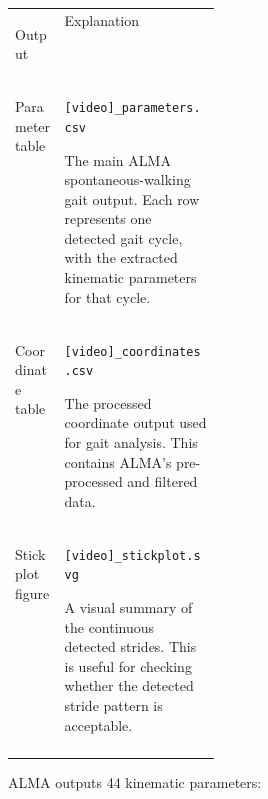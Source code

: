 \documentclass[11pt]{article}
\newif\ifalmaoutputtable
\newcommand{\boxedtoprule}{%
  \ifalmaoutputtable
    \arrayrulecolor{calloutOutputFrame}\hline\rowcolor{calloutOutputHeader}%
  \else
    \arrayrulecolor{almaBlue!62}\hline\rowcolor{almaSky!78}%
  \fi
}
\newcommand{\boxedmidrule}{%
  \ifalmaoutputtable
    \arrayrulecolor{calloutOutputFrame}\hline
  \else
    \arrayrulecolor{calloutDataFrame}\hline
  \fi
}
\newcommand{\boxedbottomrule}{%
  \ifalmaoutputtable
    \arrayrulecolor{calloutOutputFrame}\hline
  \else
    \arrayrulecolor{almaBlue!62}\hline
  \fi
}
\renewcommand{\[}{%
  \par\smallskip\noindent
  \begin{center}%
  \setlength{\fboxsep}{5pt}%
  \setlength{\fboxrule}{0.35pt}%
  \begin{lrbox}{\almaEquationBox}%
  $\displaystyle
}
\renewcommand{\]}{%
  $%
  \end{lrbox}%
  \fcolorbox{equationLine}{equationBack}{\usebox{\almaEquationBox}}%
  \end{center}%
  \smallskip\par
}
\begin{document}
\begin{tcolorbox}[output file box,title=\textbf{ALMA Spontaneous Walking Output Files}]
\begin{tabularx}{\linewidth}{
>{\bfseries\raggedright\arraybackslash}p{0.24\linewidth}|
>{\raggedright\arraybackslash}X
}
\boxedtoprule
Output & Explanation \\
\boxedmidrule

Parameter table &
\texttt{[video]\_parameters.csv}

The main ALMA spontaneous-walking gait output. Each row represents one detected
gait cycle, with the extracted kinematic parameters for that cycle. \\

Coordinate table &
\texttt{[video]\_coordinates.csv}

The processed coordinate output used for gait analysis. This contains ALMA's pre-processed and filtered data. \\

Stickplot figure &
\texttt{[video]\_stickplot.svg}

A visual summary of the continuous detected strides. This is useful
for checking whether the detected stride pattern is acceptable. \\

\boxedbottomrule
\end{tabularx}
\end{tcolorbox}


ALMA outputs 44 kinematic parameters:
\end{document}
